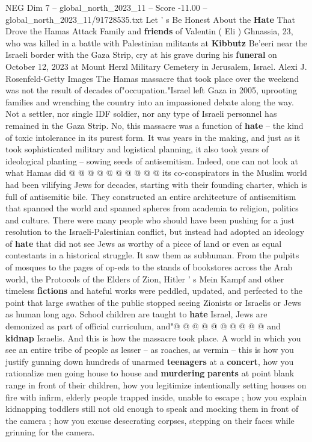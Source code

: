 \begin{textsample}{NEG Dim 7 – global\_north\_2023\_11 – Score -11.00 – global\_north\_2023\_11/91728535.txt}  \label{ex:f7_neg_045}
Let ' s Be Honest About the \textbf{Hate} That Drove the Hamas Attack Family and \textbf{friends} of Valentin ( Eli ) Ghnassia, 23, who was killed in a battle with Palestinian militants at \textbf{Kibbutz} Be'eeri near the Israeli border with the Gaza Strip, cry at his grave during his \textbf{funeral} on October 12, 2023 at Mount Herzl Military Cemetery in Jerusalem, Israel.
Alexi J.
Rosenfeld-Getty Images The Hamas massacre that took place over the weekend was not the result of decades of"occupation."Israel left Gaza in 2005, uprooting families and wrenching the country into an impassioned debate along the way.
Not a settler, nor single IDF soldier, nor any type of Israeli personnel has remained in the Gaza Strip.
No, this massacre was a function of \textbf{hate} -- the kind of toxic intolerance in its purest form.
It was years in the making, and just as it took sophisticated military and logistical planning, it also took years of ideological planting -- sowing seeds of antisemitism.
Indeed, one can not look at what Hamas did @ @ @ @ @ @ @ @ @ @ its co-conspirators in the Muslim world had been vilifying Jews for decades, starting with their founding charter, which is full of antisemitic bile.
They constructed an entire architecture of antisemitism that spanned the world and spanned spheres from academia to religion, politics and culture.
There were many people who should have been pushing for a just resolution to the Israeli-Palestinian conflict, but instead had adopted an ideology of \textbf{hate} that did not see Jews as worthy of a piece of land or even as equal contestants in a historical struggle.
It saw them as subhuman.
From the pulpits of mosques to the pages of op-eds to the stands of bookstores across the Arab world, the Protocols of the Elders of Zion, Hitler ' s Mein Kampf and other timeless \textbf{fictions} and hateful works were peddled, updated, and perfected to the point that large swathes of the public stopped seeing Zionists or Israelis or Jews as human long ago.
School children are taught to \textbf{hate} Israel, Jews are demonized as part of official curriculum, and"@ @ @ @ @ @ @ @ @ @ and \textbf{kidnap} Israelis.
And this is how the massacre took place.
A world in which you see an entire tribe of people as lesser -- as roaches, as vermin -- this is how you justify gunning down hundreds of unarmed \textbf{teenagers} at a \textbf{concert}, how you rationalize men going house to house and \textbf{murdering} \textbf{parents} at point blank range in front of their children, how you legitimize intentionally setting houses on fire with infirm, elderly people trapped inside, unable to escape ; how you explain kidnapping toddlers still not old enough to speak and mocking them in front of the camera ; how you excuse desecrating corpses, stepping on their faces while grinning for the camera.

\end{textsample}
